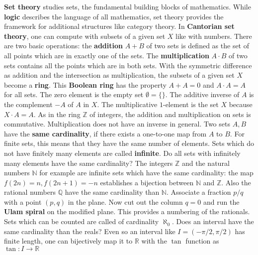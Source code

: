 \documentclass[12pt]{amsart}
\def\chapter#1{ \vspace{2mm} \begin{center} \fcolorbox{green1}{green1}{ \parbox{16.2cm}{{\Large {\bf #1}}}} \vspace{2mm} \end{center} }
\newcounter{example}    \def\example#1{ \item \fontsize{12}{15} \selectfont #1 \fontsize{12}{15} \selectfont }
\begin{document}
 \pagebreak
{}

\chapter{Lecture 7: Set Theory and Logic}

{\bf Set theory} studies sets, the fundamental building blocks of mathematics. While {\bf logic}
describes the language of all mathematics, set theory provides the framework 
for additional structures like category theory. 
In {\bf Cantorian set theory}, one can compute with subsets of a given set $X$ like with numbers. 
There are two basic operations: the {\bf addition} $A + B$ of two sets is defined as the set of
all points which are in exactly one of the sets. 
The {\bf multiplication} $A \cdot B$ of two sets contains all the 
points which are in both sets. With the symmetric difference as addition and the 
intersection as multiplication, the subsets of a given set $X$ become a 
{\bf ring}. This {\bf Boolean ring} has the property $A+A = 0$ and $A \cdot A = A$ for all sets. 
The zero element is the empty set $\emptyset=\{\}$. 
The additive inverse of $A$ is the complement $-A$ of $A$ in $X$.
The multiplicative $1$-element is the set $X$ because $X \cdot A = A$. 
As in the ring $\mathbb{Z}$ of integers, the addition and multiplication on sets
is commutative. Multiplication does not have an inverse in general. 
Two sets $A,B$ have the {\bf same cardinality}, if there exists a one-to-one map 
from $A$ to $B$. For finite sets, this means that they have the same number of elements. 
Sets which do not have finitely many elements are called {\bf infinite}. 
Do all sets with infinitely many elements have the same cardinality? 
The integers $\mathbb{Z}$ and the natural numbers $\mathbb{N}$ for example are 
infinite sets which have the same cardinality: the map
$f(2n)=n,f(2n+1)=-n$ establishes a bijection between $\mathbb{N}$ and  $\mathbb{Z}$. 
Also the rational numbers $\mathbb{Q}$ have the same cardinality than $\mathbb{N}$. 
Associate a fraction $p/q$ with a point $(p,q)$ in the plane. Now cut out the column 
$q=0$ and run the {\bf Ulam spiral} on the modified plane. This provides a numbering
of the rationals. Sets which can be counted are called of cardinality $\aleph_0$. 
Does an interval have the same cardinality than the reals? 
Even so an interval like $I=(-\pi/2,\pi/2)$ has finite length, 
one can bijectively map it to $\mathbb{R}$ with the $\tan$ function as $\tan: I \to \mathbb{R}$
\end{document}
